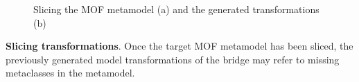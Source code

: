 \begin{figure}
  \centering
 \hspace{10mm}
  \caption{Slicing the MOF metamodel (a) and the generated transformations (b)}
  \label{fig:slicer}
\end{figure}
%
\textbf{Slicing transformations}.
Once the target MOF metamodel has been sliced, the
previously generated model transformations of the bridge may refer to missing metaclasses in the metamodel.
